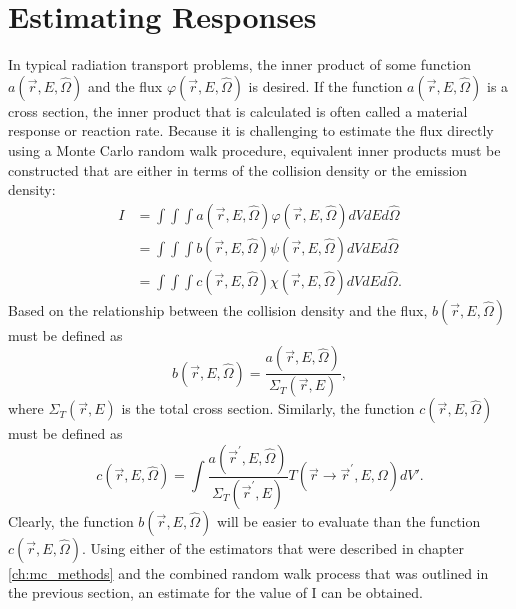 \section{Estimating Responses}
In typical radiation transport problems, the inner product of some 
function $a(\vec{r},E,\hat{\Omega})$ and the flux 
$\varphi(\vec{r},E,\hat{\Omega})$ is desired. If the function 
$a(\vec{r},E,\hat{\Omega})$ is a cross section, the inner product that is 
calculated is often called a material response or reaction rate. Because it is 
challenging to estimate the flux directly using a Monte Carlo random walk 
procedure, equivalent inner products must be constructed that are either in 
terms of the collision density or the emission density:
\begin{align}
  I & = \int\int\int a(\vec{r},E,\hat{\Omega}) \varphi(\vec{r},E,\hat{\Omega}) 
  dVdEd\hat{\Omega} \label{eq:material_response} \\
  & = \int\int\int b(\vec{r},E,\hat{\Omega}) \psi(\vec{r},E,\hat{\Omega})  
  dVdEd\hat{\Omega} \\
  & = \int\int\int c(\vec{r},E,\hat{\Omega}) \chi(\vec{r},E,\hat{\Omega}) 
  dVdEd\hat{\Omega}.
\end{align}
Based on the relationship between the collision density and the flux, 
$b(\vec{r},E,\hat{\Omega})$ must be defined as 
\begin{equation}
  b(\vec{r},E,\hat{\Omega}) = \frac{a(\vec{r},E,\hat{\Omega})}
  {\Sigma_T(\vec{r},E)},
  \label{eq:collision_response_function}
\end{equation}
where $\Sigma_T(\vec{r},E)$ is the total cross section.
Similarly, the function $c(\vec{r},E,\hat{\Omega})$ must be defined as
\begin{equation}
  c(\vec{r},E,\hat{\Omega}) = \int \frac{a(\vec{r}^{'},E,\hat{\Omega})}
  {\Sigma_T(\vec{r}^{'},E)} T(\vec{r} \to \vec{r}^{'},E,\Omega)dV'.
  \label{eq:emission_response_function}
\end{equation}
Clearly, the function $b(\vec{r},E,\hat{\Omega})$ will be easier to evaluate
than the function $c(\vec{r},E,\hat{\Omega})$. Using either of the estimators
that were described in chapter \ref{ch:mc_methods} and the combined random
walk process that was outlined in the previous section, an estimate for the
value of I can be obtained.

